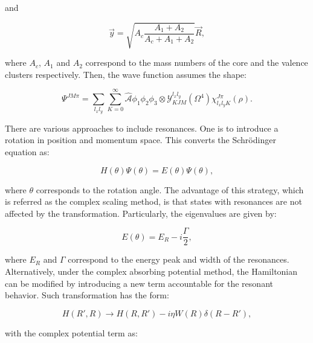 \documentclass[openany]{book}
\begin{document}
and 

\begin{equation}\label{eq:middleFusion_threeBody_cluster_y}
	\vec y = \sqrt{ A_c\frac{A_1 + A_2}{A_c + A_1 + A_2}} \vec R, 
\end{equation}

where $A_c$, $A_1$ and $A_2$ correspond to the mass numbers of the core and the valence clusters respectively. Then, the wave function assumes the shape: 

\begin{equation}\label{eq:middleFusion_threeBody_waveFunction}
	\Psi^{JM\pi} = \sum_{l_xl_y} \sum_{K = 0}^{\infty} { \hat{ \mathcal{A}} {\phi_1 \phi_2 \phi_3} \otimes  \mathcal{Y}^{l_x l_y}_{KJM}(\Omega^4) \chi^{J\pi}_{l_x l_y K}(\rho)}.
\end{equation}

There are various approaches to include resonances. One is to introduce a rotation in position and momentum space. This converts the Schrödinger equation as: 

\begin{equation}\label{eq:middleFusion_threeBody_resonances_rotation}
	H(\theta) \Psi (\theta) = E(\theta) \Psi (\theta),
\end{equation}

where $\theta$ corresponds to the rotation angle. The advantage of this strategy, which is referred as the complex scaling method, is that states with resonances are not affected by the transformation. Particularly, the eigenvalues are given by: 

\begin{equation}\label{eq:middleFusion_threeBody_resonances_rotation_eigenValues}
	E(\theta) = E_R - i \frac{\Gamma}{2},
\end{equation}

where $E_R$ and $\Gamma$ correspond to the energy peak and width of the resonances.\\

Alternatively, under the complex absorbing potential method, the Hamiltonian can be modified by introducing a new term accountable for the resonant behavior. Such transformation has the form: 

\begin{equation}\label{eq:middleFusion_threeBody_resonances_complexAbsorption}
	H(R', R) \rightarrow H(R, R') - i \eta W(R) \delta(R - R'),
\end{equation}

with the complex potential term as: 
\end{document}

